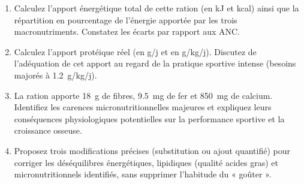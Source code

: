 \documentclass[11pt]{article}
\begin{document}
\begin{exercice}
\begin{enumerate}
    \item Calculez l'apport énergétique total de cette ration (en kJ et kcal) ainsi que la répartition en pourcentage de l'énergie apportée par les trois macronutriments. Constatez les écarts par rapport aux ANC.
    \item Calculez l'apport protéique réel (en g/j et en g/kg/j). Discutez de l'adéquation de cet apport au regard de la pratique sportive intense (besoins majorés à \SI{1,2}{g/kg/j}).
    \item La ration apporte \SI{18}{g} de fibres, \SI{9,5}{mg} de fer et \SI{850}{mg} de calcium. Identifiez les carences micronutritionnelles majeures et expliquez leurs conséquences physiologiques potentielles sur la performance sportive et la croissance osseuse.
    \item Proposez trois modifications précises (substitution ou ajout quantifié) pour corriger les déséquilibres énergétiques, lipidiques (qualité acides gras) et micronutritionnels identifiés, sans supprimer l'habitude du « goûter ».
\end{enumerate}
\end{exercice}
\end{document}
